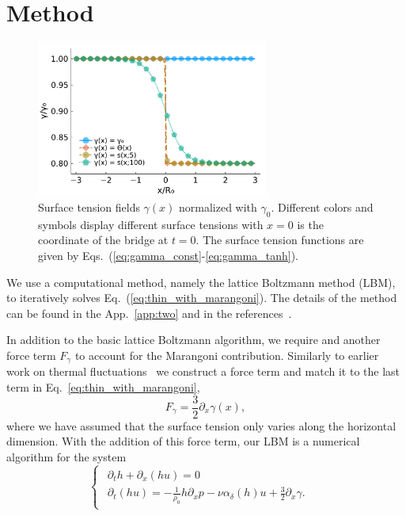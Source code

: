 \section{Method}\label{sec:method_five}
\begin{figure}
    \centering
    \includegraphics[width=0.68\textwidth]{graphics/gammas.pdf}
    \caption{Surface tension fields $\gamma(x)$ normalized with $\gamma_0$.
    Different colors and symbols display different surface tensions with $x=0$ is the coordinate of the bridge at $t=0$.
    The surface tension functions are given by Eqs.~(\ref{eq:gamma_const}-\ref{eq:gamma_tanh}).
    }
    \label{fig:gammas}
\end{figure}
We use a computational method, namely the lattice Boltzmann method (LBM), to iteratively solves Eq.~(\ref{eq:thin_with_marangoni}).
The details of the method can be found in the App.~\ref{app:two} and in the references~\cite{PhysRevE.100.033313, PhysRevE.104.034801}.

In addition to the basic lattice Boltzmann algorithm, we require and another force term $F_{\gamma}$ to account for the Marangoni contribution.
Similarly to earlier work on thermal fluctuations~\cite{PhysRevE.104.034801} we construct a force term and match it to the last term in Eq.~\ref{eq:thin_with_marangoni}, 
\begin{equation}\label{eq:force_gamma_grad}
    F_{\gamma} = \frac{3}{2}\partial_x\gamma(x),
\end{equation}
where we have assumed that the surface tension only varies along the horizontal dimension.
With the addition of this force term, our LBM is a numerical algorithm for the system
\begin{equation}\label{eq:lubr2eq1surf}
\begin{cases}
\begin{array}{ll}
\partial_t h + \partial_x (h u)  = 0 & \\ 
\partial_t (h u) = -\frac{1}{\rho_0}h\partial_x p -\nu\alpha_{\delta}(h)u + \frac{3}{2}\partial_x\gamma.
\end{array}
\end{cases}
\end{equation}

